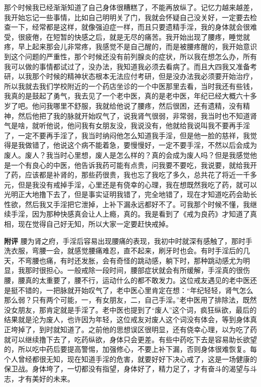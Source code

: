 \begin{case}
    那个时候我已经渐渐知道了自己身体很糟糕了，不能再放纵了。记忆力越来越差，我开始忘记一些事情，比如自己明明关了门，我就会怀疑自己没关好，一定要去检查一下，经常都是这样，就像强迫症一样，而且只要遗精手淫，我的身体就会很难受，很疲倦，在短暂的快感之后，就是无尽的痛苦。我开始出现了腰疼，睡觉就疼，早上起来那会儿非常疼，我感觉不是自己醒的，而是被腰疼醒的，我开始意识到这个问题的严重性，那个时候还没有前列腺炎的症状，所以我在想怎么办，所有我可以做的事情都试过了，没办法，我知道我必须去看病了。而且大四我又准备考研，以我那个时候的精神状态根本无法应付考研，但是没办法我必须要开始治疗，所以我就去我们学校附近的一个药店坐诊的一个中医那里去看，当时我还有些钱，我真的是鼓起了勇气，我去见了一个老中医，真的是老中医，年纪已经大概六十多岁了吧。他问我哪里不舒服，我就给他说了腰疼，然后很困，还有遗精，没有精神，然后他把了我的脉就开始叹气了，说我肾气很弱，非常弱，我当时也不知道肾气是啥，就听他说，他问我有女朋友没，我说没有，他就给我说叫我不要再手淫了，一定不要再手淫了，我当时纳闷他怎么知道我手淫，但是他一脸的慈祥，我觉得是我做错了，他说这个病不能着急，要慢慢好，一定不要手淫，不然以后会成为废人。废人？我当时心里想，废人是怎么样的？真的会成为废人吗？但是我感觉他是一个有良心的中医，他告诉我药可能有点贵，问我要不要吃，我说要，就给我开了药，应该都是补肾的，那些药很贵，我也忘了我吃了多久，总共花了将近一千多元，但是我没有戒掉手淫，心里还是有侥幸的心理，我在想既然我吃了药，就可以光明正大地撸下去了，但是事实证明我错了，完全地错了，现在才知道吃药会助长性欲，然后我又手淫把它泄掉，上补下漏永远都好不了。可我那个时候不懂，我继续手淫，因为那种快感真会让人上瘾，真的。我是看到了《戒为良药》才知道了真相，现在觉得自己好无知，所以大家一定要赶快戒掉。

    \textbf{附评} 腰为肾之府，手淫后容易出现腰痛的表现，我初中时就深有感触了，那时手洗衣服，弯腰一会，就感觉腰痛难忍，直不起来，刷牙时也会。有时手淫后的几天，不弯腰也痛，有时还发胀，会有奇怪的跳动感，躺下时，那种跳动感尤为明显，我那时很担心。一般戒除一段时间，腰部症状就会有所缓解，手淫真的很伤腰，腰真的太重要了，腰不行，运动什么的都不敢发力。这位戒友遇见的老中医还是挺不错的，一把脉就开始叹气了，老中医心里肯定在想：“年纪轻轻，肾气怎么那么弱？只有两个可能，一，有女朋友，二，自己手淫。”老中医用了排除法，既然没女朋友，那肯定就是手淫了。老中医也提到了“废人”这个词，疯狂纵欲，最后的结果就是沦为废人，也许因为年轻，这位戒友对废人这个词没有体会，等到身体真正垮掉了，到时就知道了。之前他的思想误区很明显，还有侥幸心理，以为吃了药就可以继续撸下去了，吃药纵欲，身体只会更差。有些中药吃下去是容易助长欲望的，所以吃中药后要提高警惕，加强修心，不要上补下漏，否则身体很难恢复。每个人曾经都很无知，现在知道手淫的危害，就要好好下决心戒了，这是一场健康的保卫战。身体垮了，一切都没有指望，身体好了，精力足了，才有奋斗的渴望与斗志，才有美好的未来。
\end{case}

